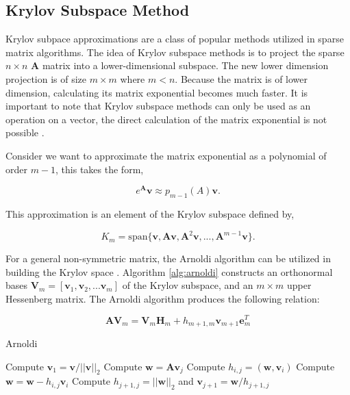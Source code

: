 \subsection{Krylov Subspace Method}
Krylov subpace approximations are a class of popular methods utilized in sparse matrix algorithms. The idea of Krylov subspace methods is to project the sparse $n \times n$ $\boldsymbol{A}$ matrix into a lower-dimensional subspace. The new lower dimension projection is of size $m \times m$ where $m < n$. Because the matrix is of lower dimension, calculating its matrix exponential becomes much faster. It is important to note that Krylov subspace methods can only be used as an operation on a vector, the direct calculation of the matrix exponential is not possible \cite{saad1992}.  

Consider we want to approximate the matrix exponential as a polynomial of order $m-1$, this takes the form,

\begin{equation}
    e^{\boldsymbol{A}}\boldsymbol{v} \approx p_{m-1}(A)\boldsymbol{v}.
    \label{eq:expPolynomailForm}
\end{equation}

\noindent This approximation is an element of the Krylov subspace defined by,

\begin{equation}
    K_{m} = \text{span}\{\boldsymbol{v}, \boldsymbol{A}\boldsymbol{v}, \boldsymbol{A}^{2}\boldsymbol{v}, ... ,\boldsymbol{A}^{m-1}\boldsymbol{v}\}.
\end{equation}

\noindent For a general non-symmetric matrix, the Arnoldi algorithm can be utilized in building the Krylov space \cite{saad1992} \cite{saad1989}. Algorithm \ref{alg:arnoldi} constructs an orthonormal bases $\boldsymbol{V}_{m} = [\boldsymbol{v}_{1}, \boldsymbol{v}_{2}, ... \boldsymbol{v}_{m}]$ of the Krylov subspace, and an $m \times m$ upper Hessenberg matrix. The Arnoldi algorithm produces the following relation:

\begin{equation}
    \boldsymbol{A}\boldsymbol{V}_{m} = \boldsymbol{V}_{m}\boldsymbol{H}_{m} + h_{m+1,m}\boldsymbol{v}_{m+1}\boldsymbol{e}^{T}_{m}
    \label{eq:arnoldiResult}
\end{equation}

\begin{algorithm}
	\caption{Arnoldi} 
	\begin{algorithmic}[1]
	    \State Compute $\boldsymbol{v}_{1} = \boldsymbol{v}/||\boldsymbol{v}||_{2}$
            \State Compute $\boldsymbol{w} = \boldsymbol{A}\boldsymbol{v}_{j}$
                \State Compute $h_{i,j} = (\boldsymbol{w},\boldsymbol{v}_{i})$
                \State Compute $\boldsymbol{w} = \boldsymbol{w} - h_{i,j}\boldsymbol{v}_{i}$
            \EndFor
            \State Compute $h_{j+1, j} = ||\boldsymbol{w}||_{2}$ and $\boldsymbol{v}_{j+1} = \boldsymbol{w}/h_{j+1,j}$
		\EndFor
	\end{algorithmic} 
	\label{alg:arnoldi}
\end{algorithm}

